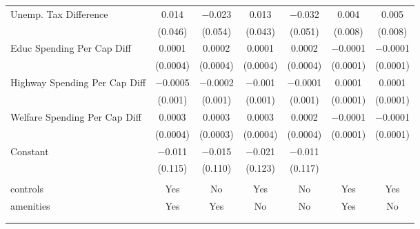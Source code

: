 \begin{table}[!htbp]
\begin{tabular}{@{\extracolsep{5pt}}lcccccc}
  Unemp. Tax Difference & 0.014 & $-$0.023 & 0.013 & $-$0.032 & 0.004 & 0.005 \\ 
  & (0.046) & (0.054) & (0.043) & (0.051) & (0.008) & (0.008) \\ 
  Educ Spending Per Cap Diff & 0.0001 & 0.0002 & 0.0001 & 0.0002 & $-$0.0001 & $-$0.0001 \\ 
  & (0.0004) & (0.0004) & (0.0004) & (0.0004) & (0.0001) & (0.0001) \\ 
  Highway Spending Per Cap Diff & $-$0.0005 & $-$0.0002 & $-$0.001 & $-$0.0001 & 0.0001 & 0.0001 \\ 
  & (0.001) & (0.001) & (0.001) & (0.001) & (0.0001) & (0.0001) \\ 
  Welfare Spending Per Cap Diff & 0.0003 & 0.0003 & 0.0003 & 0.0002 & $-$0.0001 & $-$0.0001 \\ 
  & (0.0004) & (0.0003) & (0.0004) & (0.0004) & (0.0001) & (0.0001) \\ 
  Constant & $-$0.011 & $-$0.015 & $-$0.021 & $-$0.011 &  &  \\ 
  & (0.115) & (0.110) & (0.123) & (0.117) &  &  \\ 
 \hline \\[-1.8ex] 
controls & Yes & No & Yes & No & Yes & Yes \\ 
amenities & Yes & Yes & No & No & Yes & No \\ 
\hline \\[-1.8ex] 
\hline 
\hline \\[-1.8ex] 
\end{tabular} 
\end{table} 
